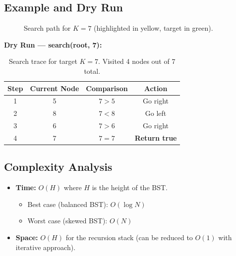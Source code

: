\documentclass[10pt,journal,compsoc,onecolumn]{IEEEtran}
\begin{document}
\subsection{Example and Dry Run}

\begin{figure}[htbp]
\centering
{}
\caption{Search path for $K=7$ (highlighted in yellow, target in green).}
\end{figure}

\textbf{Dry Run --- search(root, 7):}

\begin{table}[htbp]
\centering
\begin{tabular}{|c|c|c|c|}
\hline
\textbf{Step} & \textbf{Current Node} & \textbf{Comparison} & \textbf{Action} \\
\hline
1 & 5 & $7 > 5$ & Go right \\
2 & 8 & $7 < 8$ & Go left \\
3 & 6 & $7 > 6$ & Go right \\
4 & 7 & $7 = 7$ & \textbf{Return true} \\
\hline
\end{tabular}
\caption{Search trace for target $K=7$. Visited 4 nodes out of 7 total.}
\end{table}

\subsection{Complexity Analysis}

\begin{itemize}
    \item \textbf{Time:} $O(H)$ where $H$ is the height of the BST.
    \begin{itemize}
        \item Best case (balanced BST): $O(\log N)$
        \item Worst case (skewed BST): $O(N)$
    \end{itemize}
    \item \textbf{Space:} $O(H)$ for the recursion stack (can be reduced to $O(1)$ with iterative approach).
\end{itemize}
\end{document}
